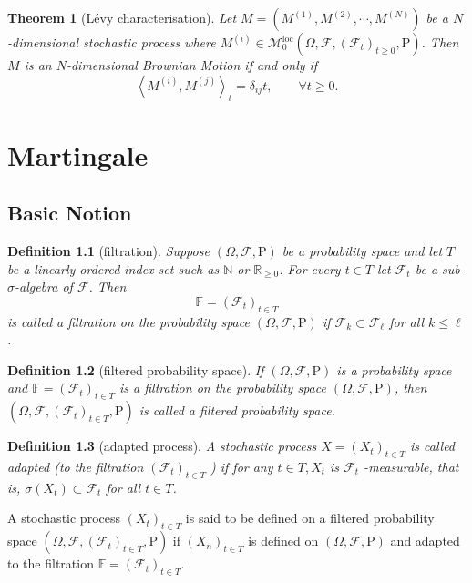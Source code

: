 \documentclass{report}
\newtheorem{definition}{Definition}[section]
\newtheorem{theorem}{Theorem}[section]
\theoremstyle{nonumberplain}
\begin{document}
\begin{theorem}[Lévy characterisation]
	Let $M=\left(M^{(1)}, M^{(2)}, \cdots, M^{(N)}\right)$ be a $N$-dimensional stochastic process where $M^{(i)}\in\mathscr{M}_0^{\mathrm{loc}}(\Omega,\mathcal{F},(\mathcal{F}_{t})_{t\ge0},\mathrm{P})$. Then $M$ is an $N$-dimensional Brownian Motion if and only if 
	\[
	\left\langle M^{(i)},M^{(j)}\right\rangle_t=\delta_{ij}t,\qquad\forall t\ge0.
	\]
\end{theorem}

\chapter{Martingale}
\section{Basic Notion}

\begin{definition}[filtration]
Suppose $(\Omega,\mathcal{F},\mathrm{P})$ be a probability space and let $T$ be a linearly ordered index set such as $\mathbb{N}$ or $\mathbb{R}_{\ge 0}$. For every $t\in T$ let $\mathcal{F}_{t}$ be a sub-$\sigma$-algebra of $\mathcal{F}$. Then
\[
\mathbb{F} =(\mathcal{F}_{t})_{t\in T}
\]
is called a \emph{filtration} on the probability space $(\Omega,\mathcal{F},\mathrm{P})$ if $\mathcal {F}_{k}\subset \mathcal{F}_{\ell}$ for all $k\leq \ell$. 
\end{definition}
\begin{definition}[filtered probability space]
	If $(\Omega,\mathcal{F},\mathrm{P})$ is a probability space and $ \mathbb {F}=(\mathcal{F}_{t})_{t\in T }$ is a filtration on the probability space $(\Omega,\mathcal{F},\mathrm{P})$, then $(\Omega,\mathcal{F},(\mathcal{F}_{t})_{t\in T },\mathrm{P})$ is called a \emph{filtered probability space}.
\end{definition}

\begin{definition}[adapted process]
	A stochastic process $X=(X_{t})_{t \in T}$ is called \emph{adapted} (to the filtration $(\mathcal{F}_{t})_{t\in T}$ ) if for any $t \in T, X_{t}$ is $\mathcal{F}_{t}$ -measurable, that is, $\sigma(X_t)\subset \mathcal{F}_t$ for all $t\in T$.
\end{definition}

A stochastic process $(X_{t})_{t\in T }$ is said to be defined on a filtered probability space $(\Omega,\mathcal{F},(\mathcal{F}_{t})_{t\in T },\mathrm{P})$ if $(X_{n})_{t\in T }$ is defined on $(\Omega,\mathcal{F},\mathrm{P})$ and adapted to the filtration $\mathbb{F} =(\mathcal{F}_{t})_{t\in T }$. 
\end{document}
